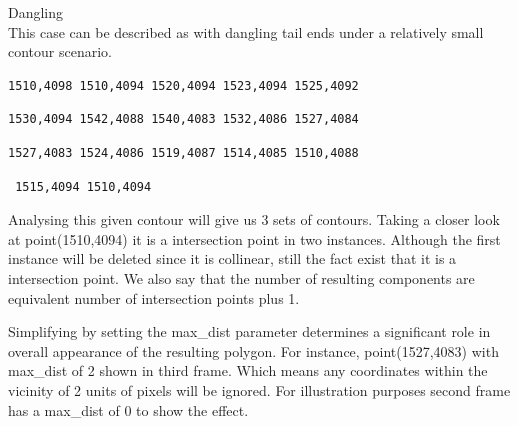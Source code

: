 \documentclass{sig-alternate}
\begin{document}
Dangling \\

This case can be described as with dangling tail ends under a relatively small contour scenario.
\begin{verbatim}
1510,4098 1510,4094 1520,4094 1523,4094 1525,4092  
\end{verbatim}
\begin{verbatim}
1530,4094 1542,4088 1540,4083 1532,4086 1527,4084  
\end{verbatim}  
\begin{verbatim}
1527,4083 1524,4086 1519,4087 1514,4085 1510,4088
\end{verbatim}
\begin{verbatim}
 1515,4094 1510,4094 
\end{verbatim}
 
Analysing this given contour will give us 3 sets of contours. Taking a closer look at point(1510,4094) it is a intersection point in two instances. Although the first instance will be deleted since it is collinear, still the fact exist that it is a intersection point. We also say that the number of resulting components are equivalent number of intersection points plus 1.
 
Simplifying by setting the max\_dist parameter determines a significant role in overall appearance of the resulting polygon. For instance, point(1527,4083) with max\_dist of 2 shown in third frame. Which means any 
coordinates within the vicinity of 2 units of pixels will be ignored. For illustration purposes second frame has a max\_dist of 0 to show the effect.\\
 
\end{document}
